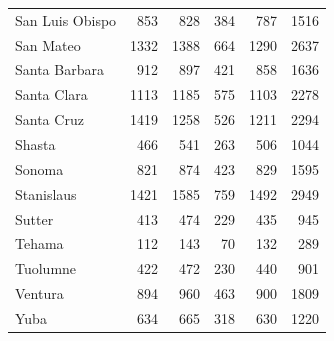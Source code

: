 \documentclass{asaproc}
\begin{document}
\begin{table}[p!]
\begin{tabular}{lrrrrr}
  San Luis Obispo & 853 & 828 & 384 & 787 & 1516 \\ 
  San Mateo & 1332 & 1388 & 664 & 1290 & 2637 \\ 
  Santa Barbara & 912 & 897 & 421 & 858 & 1636 \\ 
  Santa Clara & 1113 & 1185 & 575 & 1103 & 2278 \\ 
  Santa Cruz & 1419 & 1258 & 526 & 1211 & 2294 \\ 
  Shasta & 466 & 541 & 263 & 506 & 1044 \\ 
  Sonoma & 821 & 874 & 423 & 829 & 1595 \\
  Stanislaus & 1421 & 1585 & 759 & 1492 & 2949 \\ 
  Sutter & 413 & 474 & 229 & 435 & 945 \\ 
  Tehama & 112 & 143 & 70 & 132 & 289 \\ 
  Tuolumne & 422 & 472 & 230 & 440 & 901 \\ 
  Ventura & 894 & 960 & 463 & 900 & 1809 \\ 
  Yuba & 634 & 665 & 318 & 630 & 1220 \\ 
   \hline
\end{tabular}
\end{table}
\end{document}
